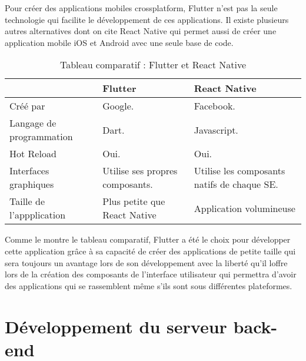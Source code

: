 Pour créer des applications mobiles crossplatform, Flutter n'est pas la seule technologie qui facilite le développement de ces applications. Il existe plusieurs autres alternatives dont on cite React Native\cite{react_native} qui permet aussi de créer une application mobile iOS et Android avec une seule base de code.
\begin{table}[H]
    \begin{center}
        \begin{tabularx}{\textwidth} {
                | >{\centering\arraybackslash}X
                | >{\centering\arraybackslash}X
                | >{\centering\arraybackslash}X |}
            \hline
                                     & Flutter                         & React Native                                \\
            \hline
            Créé par                 & Google.                         & Facebook.                                   \\
            \hline
            Langage de programmation & Dart.                           & Javascript.                                 \\
            \hline
            Hot Reload               & Oui.                            & Oui.                                        \\
            \hline
            Interfaces graphiques    & Utilise ses propres composants. & Utilise les composants natifs de chaque SE. \\
            \hline
            Taille de l'appplication & Plus petite que React Native    & Application volumineuse                     \\
            \hline
        \end{tabularx}
        \captionsetup{justification = centering}
        \caption{Tableau comparatif : Flutter et React Native}
        \label{compare_flutter_react_native}
    \end{center}
\end{table}
Comme le montre le tableau comparatif, Flutter a été le choix pour développer cette application grâce à sa capacité de créer des applications de petite taille qui sera toujours un avantage lors de son développement avec la liberté qu'il loffre lors de la création des composants de l'interface utilisateur qui permettra d'avoir des applications qui se rassemblent même s'ils sont sous différentes plateformes.


\section{Développement du serveur back-end}
